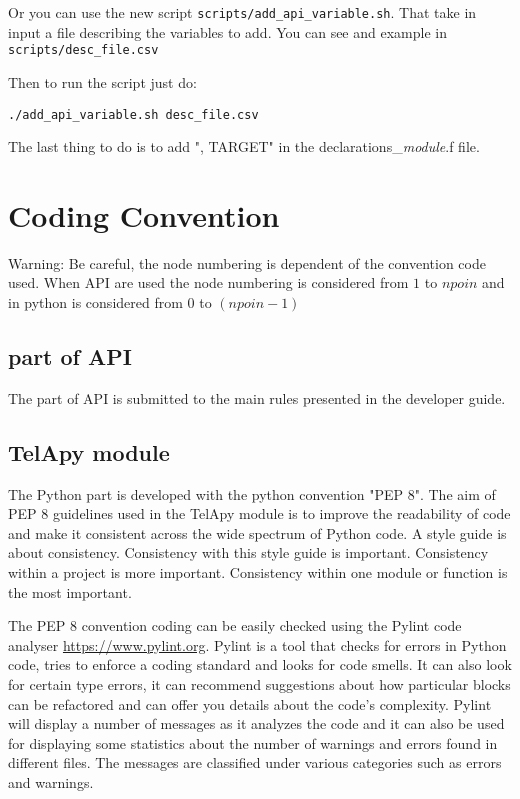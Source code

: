 Or you can use the new script \verb!scripts/add_api_variable.sh!. That take in
input a file describing the variables to add. You can see and example in
\verb!scripts/desc_file.csv!

Then to run the script just do:
\begin{lstlisting}
./add_api_variable.sh desc_file.csv
\end{lstlisting}


The last thing to do is to add ", TARGET" in the
declarations\_\textit{module}.f file.

%
\section{Coding Convention}
%
\begin{WarningBlock}{Warning:}
\centering
Be careful, the node numbering is dependent of the convention code used.
When \fortran API are used the node numbering is considered from
$1$ to $npoin$ and in python is considered from $0$ to $(npoin-1)$
\end{WarningBlock}

\subsection{\fortran part of API}

The \fortran part of \telemacsystem API is submitted to the main rules presented
in the developer guide.

\subsection{TelApy module}

The Python part is developed with the python convention "PEP 8". The aim of
PEP 8 guidelines used in the TelApy module is to improve the readability of
code and make it consistent across the wide spectrum of Python code. A style
guide is about consistency. Consistency with this style guide is important.
Consistency within a project is more important. Consistency within one module
or function is the most important.

The PEP 8 convention coding can be easily checked using the Pylint code
analyser \url{https://www.pylint.org}. Pylint is a tool that checks for
errors in Python code, tries to enforce a coding standard and looks for code
smells. It can also look for certain type errors, it can recommend suggestions
about how particular blocks can be refactored and can offer you details about
the code’s complexity. Pylint will display a number of messages as it analyzes
the code and it can also be used for displaying some statistics about the
number of warnings and errors found in different files. The messages are
classified under various categories such as errors and warnings.


